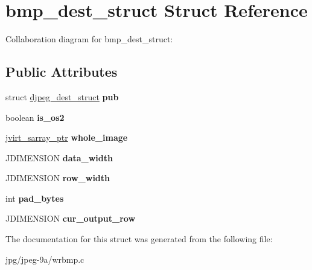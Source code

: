 \hypertarget{structbmp__dest__struct}{\section{bmp\+\_\+dest\+\_\+struct Struct Reference}
\label{structbmp__dest__struct}
}


Collaboration diagram for bmp\+\_\+dest\+\_\+struct\+:
\subsection*{Public Attributes}
\begin{DoxyCompactItemize}
\item 
\hypertarget{structbmp__dest__struct_ae8864eaecf8ddcbfb73d6f8ba103f5ba}{struct \hyperlink{structdjpeg__dest__struct}{djpeg\+\_\+dest\+\_\+struct} {\bfseries pub}}\label{structbmp__dest__struct_ae8864eaecf8ddcbfb73d6f8ba103f5ba}

\item 
\hypertarget{structbmp__dest__struct_a8eef1e29313e7eeced0c95a1a5ec854c}{boolean {\bfseries is\+\_\+os2}}\label{structbmp__dest__struct_a8eef1e29313e7eeced0c95a1a5ec854c}

\item 
\hypertarget{structbmp__dest__struct_a792c3ffe23e357dd2ed3a07a14a6354a}{\hyperlink{structjvirt__sarray__control}{jvirt\+\_\+sarray\+\_\+ptr} {\bfseries whole\+\_\+image}}\label{structbmp__dest__struct_a792c3ffe23e357dd2ed3a07a14a6354a}

\item 
\hypertarget{structbmp__dest__struct_a185c2233e3dcb0b2f3002ea0ceff3b07}{J\+D\+I\+M\+E\+N\+S\+I\+O\+N {\bfseries data\+\_\+width}}\label{structbmp__dest__struct_a185c2233e3dcb0b2f3002ea0ceff3b07}

\item 
\hypertarget{structbmp__dest__struct_ad02ecd6731a98f78160751ffd778a7f6}{J\+D\+I\+M\+E\+N\+S\+I\+O\+N {\bfseries row\+\_\+width}}\label{structbmp__dest__struct_ad02ecd6731a98f78160751ffd778a7f6}

\item 
\hypertarget{structbmp__dest__struct_ac17f26514272264feb1fbb611adb4168}{int {\bfseries pad\+\_\+bytes}}\label{structbmp__dest__struct_ac17f26514272264feb1fbb611adb4168}

\item 
\hypertarget{structbmp__dest__struct_a127fca850d4c09d80727c2a749ca269f}{J\+D\+I\+M\+E\+N\+S\+I\+O\+N {\bfseries cur\+\_\+output\+\_\+row}}\label{structbmp__dest__struct_a127fca850d4c09d80727c2a749ca269f}

\end{DoxyCompactItemize}


The documentation for this struct was generated from the following file\+:\begin{DoxyCompactItemize}
\item 
jpg/jpeg-\/9a/wrbmp.\+c\end{DoxyCompactItemize}

